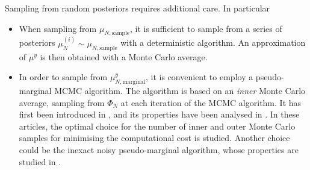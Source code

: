 \documentclass{article}
\theoremstyle{remark}
\theoremstyle{definition}
\begin{document}
Sampling from random posteriors requires additional care. In particular
\begin{itemize}
\item When sampling from $\mu_{N, \mathrm{sample}}$, it is sufficient to sample from a series of posteriors $\mu_N^{(i)} \sim \mu_{N, \mathrm{sample}}$ with a deterministic algorithm. An approximation of $\mu^y$ is then obtained with a Monte Carlo average. 
\item In order to sample from $\mu_{N, \mathrm{marginal}}^y$, it is convenient to employ a pseudo-marginal MCMC algorithm. The algorithm is based on an \textit{inner} Monte Carlo average, sampling from $\Phi_N$ at each iteration of the MCMC algorithm. It has first been introduced in \cite{AnR09}, and its properties have been analysed in \cite{DPD15, STR15, DDP17}. In these articles, the optimal choice for the number of inner and outer Monte Carlo samples for minimising the computational cost is studied. Another choice could be the inexact noisy pseudo-marginal algorithm, whose properties are studied in \cite{MLR16, AFE16}.
\end{itemize}



\end{document}
